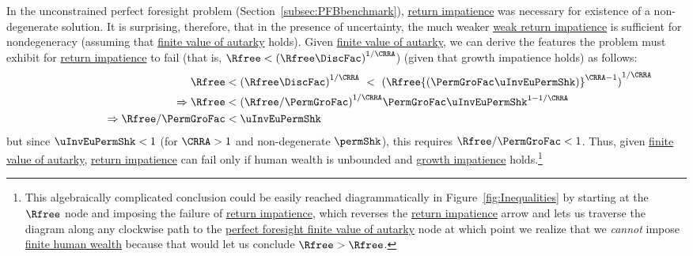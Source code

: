\documentclass[\econtexRoot/BufferStockTheory]{subfiles}
\begin{document}
In the unconstrained perfect foresight problem (Section~\ref{subsec:PFBbenchmark}), \hyperlink{RIC}{return impatience} was necessary for existence of a non-degenerate solution.
It is surprising, therefore, that in the presence of uncertainty, the much weaker \hyperlink{WRIC}{weak return impatience} is sufficient for nondegeneracy (assuming that \hyperlink{FVAC}{finite value of autarky}  holds).
Given \hyperlink{FVAC}{finite value of autarky}, we can derive the features the problem must exhibit for \hyperlink{RIC}{return impatience} to fail (that is, $\Rfree < {(\Rfree \DiscFac)}^{1/\CRRA}$) (given that growth impatience holds) as follows:
%
\begin{equation}\label{eq:RICimplies}
  \begin{aligned}
    \Rfree   & < {(\Rfree \DiscFac)}^{1/\CRRA} ~ < ~ {(\Rfree {(\PermGroFac \uInvEuPermShk)}^{\CRRA-1})}^{1/\CRRA}
    \\ \Rightarrow \Rfree   & < {(\Rfree/\PermGroFac)}^{1/\CRRA}\PermGroFac \uInvEuPermShk^{1-1/\CRRA}
    \\  \qquad\qquad\qquad \Rightarrow  \Rfree/\PermGroFac  & < \uInvEuPermShk
  \end{aligned}
\end{equation}
%
but since $\uInvEuPermShk < 1$ (for $\CRRA>1$ and non-degenerate $\permShk$), this requires $\Rfree/\PermGroFac < 1$.
Thus, given \hyperlink{FVAC}{finite value of autarky}, \hyperlink{RIC}{return impatience} can fail only if human wealth is unbounded and \hyperlink{GICRaw}{growth impatience} holds.\footnote{This algebraically complicated conclusion could be easily reached diagrammatically in Figure~\ref{fig:Inequalities} by starting at the $\Rfree$ node and imposing the failure of \hyperlink{RIC}{return impatience}, which reverses the \hyperlink{RIC}{return impatience} arrow and lets us traverse the diagram along any clockwise path to the \hyperlink{PFFVAC}{perfect foresight finite value of autarky} node at which point we realize that we \textit{cannot} impose \hyperlink{FHWC}{finite human wealth} because that would let us conclude $\Rfree > \Rfree$.}
\end{document}
